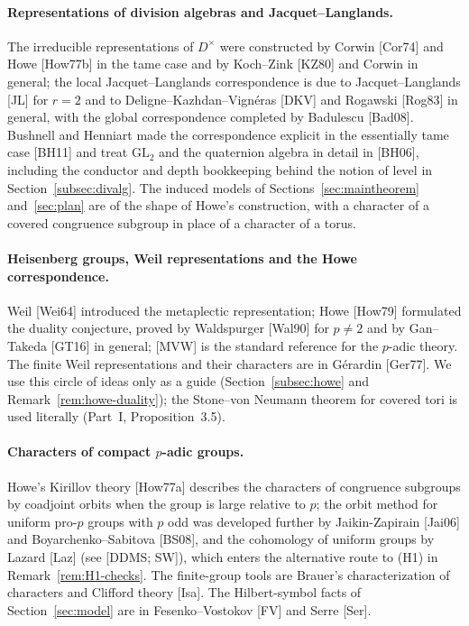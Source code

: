 \documentclass[11pt]{article}
\theoremstyle{plain}
\theoremstyle{definition}
\begin{document}
\paragraph{Representations of division algebras and Jacquet--Langlands.}
The irreducible representations of $D^\times$ were constructed by Corwin
[Cor74] and Howe [How77b] in the tame case and by Koch--Zink [KZ80] and
Corwin in general; the local Jacquet--Langlands correspondence is due to
Jacquet--Langlands [JL] for $r=2$ and to Deligne--Kazhdan--Vign\'eras
[DKV] and Rogawski [Rog83] in general, with the global correspondence
completed by Badulescu [Bad08].  Bushnell and Henniart made the
correspondence explicit in the essentially tame case [BH11] and treat
$\mathrm{GL}_2$ and the quaternion algebra in detail in [BH06], including
the conductor and depth bookkeeping behind the notion of level in
Section~\ref{subsec:divalg}.  The induced models of
Sections~\ref{sec:maintheorem} and~\ref{sec:plan} are of the shape of
Howe's construction, with a character of a covered congruence subgroup
in place of a character of a torus.

\paragraph{Heisenberg groups, Weil representations and the Howe
correspondence.}  Weil [Wei64] introduced the metaplectic
representation; Howe [How79] formulated the duality conjecture, proved
by Waldspurger [Wal90] for $p\ne2$ and by Gan--Takeda [GT16] in general;
[MVW] is the standard reference for the $p$-adic theory.  The finite
Weil representations and their characters are in G\'erardin [Ger77].
We use this circle of ideas only as a guide (Section~\ref{subsec:howe}
and Remark~\ref{rem:howe-duality}); the Stone--von Neumann theorem for
covered tori is used literally (Part~I, Proposition~3.5).

\paragraph{Characters of compact $p$-adic groups.}  Howe's Kirillov
theory [How77a] describes the characters of congruence subgroups by
coadjoint orbits when the group is large relative to $p$; the orbit
method for uniform pro-$p$ groups with $p$ odd was developed further by
Jaikin-Zapirain [Jai06] and Boyarchenko--Sabitova [BS08], and the
cohomology of uniform groups by Lazard [Laz] (see [DDMS; SW]), which
enters the alternative route to (H1) in Remark~\ref{rem:H1-checks}.  The
finite-group tools are Brauer's characterization of characters and
Clifford theory [Isa].  The Hilbert-symbol facts of
Section~\ref{sec:model} are in Fesenko--Vostokov [FV] and Serre [Ser].
\end{document}
